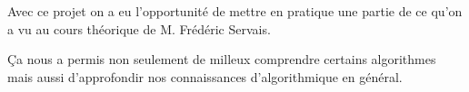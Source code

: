 \documentclass[11pt,a4paper]{article}
\begin{document}
Avec ce projet on a eu l'opportunité de mettre en pratique une partie
de ce qu'on a vu au cours théorique de M. Frédéric Servais.\par Ça
nous a permis non seulement de milleux comprendre certains algorithmes
mais aussi d'approfondir nos connaissances d'algorithmique en général.

\nocite{*}


\end{document}
